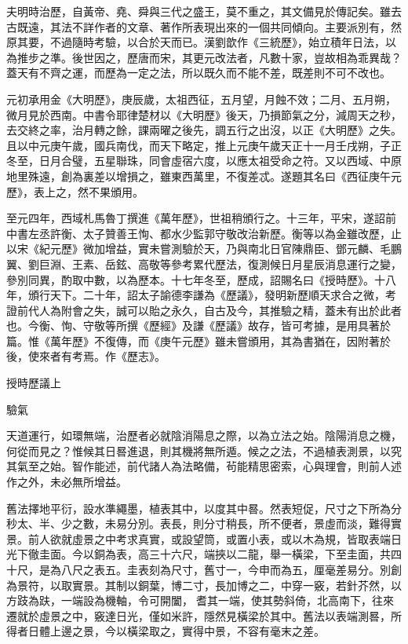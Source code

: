 
\begin{pinyinscope}

 夫明時治歷，自黃帝、堯、舜與三代之盛王，莫不重之，其文備見於傳記矣。雖去古既遠，其法不詳作者的文章、著作所表現出來的一個共同傾向。主要派別有，然原其要，不過隨時考驗，以合於天而已。漢劉歆作《三統歷》，始立積年日法，以為推步之準。後世因之，歷唐而宋，其更元改法者，凡數十家，豈故相為乖異哉？蓋天有不齊之運，而歷為一定之法，所以既久而不能不差，既差則不可不改也。



 元初承用金《大明歷》，庚辰歲，太祖西征，五月望，月蝕不效；二月、五月朔，微月見於西南。中書令耶律楚材以《大明歷》後天，乃損節氣之分，減周天之秒，去交終之率，治月轉之餘，課兩曜之後先，調五行之出沒，以正《大明歷》之失。且以中元庚午歲，國兵南伐，而天下略定，推上元庚午歲天正十一月壬戌朔，子正冬至，日月合璧，五星聯珠，同會虛宿六度，以應太祖受命之符。又以西域、中原地里殊遠，創為裏差以增損之，雖東西萬里，不復差忒。遂題其名曰《西征庚午元歷》，表上之，然不果頒用。



 至元四年，西域札馬魯丁撰進《萬年歷》，世祖稍頒行之。十三年，平宋，遂詔前中書左丞許衡、太子贊善王恂、都水少監郭守敬改治新歷。衡等以為金雖改歷，止以宋《紀元歷》微加增益，實未嘗測驗於天，乃與南北日官陳鼎臣、鄧元麟、毛鵬翼、劉巨淵、王素、岳鉉、高敬等參考累代歷法，復測候日月星辰消息運行之變，參別同異，酌取中數，以為歷本。十七年冬至，歷成，詔賜名曰《授時歷》。十八年，頒行天下。二十年，詔太子諭德李謙為《歷議》，發明新歷順天求合之微，考證前代人為附會之失，誠可以貽之永久，自古及今，其推驗之精，蓋未有出於此者也。今衡、恂、守敬等所撰《歷經》及謙《歷議》故存，皆可考據，是用具著於篇。惟《萬年歷》不復傳，而《庚午元歷》雖未嘗頒用，其為書猶在，因附著於後，使來者有考焉。作《歷志》。



 授時歷議上



 驗氣



 天道運行，如環無端，治歷者必就陰消陽息之際，以為立法之始。陰陽消息之機，何從而見之？惟候其日晷進退，則其機將無所遁。候之之法，不過植表測景，以究其氣至之始。智作能述，前代諸人為法略備，茍能精思密索，心與理會，則前人述作之外，未必無所增益。



 舊法擇地平衍，設水準繩墨，植表其中，以度其中晷。然表短促，尺寸之下所為分秒太、半、少之數，未易分別。表長，則分寸稍長，所不便者，景虛而淡，難得實景。前人欲就虛景之中考求真實，或設望筒，或置小表，或以木為規，皆取表端日光下徹圭面。今以銅為表，高三十六尺，端挾以二龍，舉一橫梁，下至圭面，共四十尺，是為八尺之表五。圭表刻為尺寸，舊寸一，今申而為五，厘毫差易分。別創為景符，以取實景。其制以銅葉，博二寸，長加博之二，中穿一竅，若針芥然，以方跂為趺，一端設為機軸，令可開闔，耆其一端，使其勢斜倚，北高南下，往來遷就於虛景之中，竅達日光，僅如米許，隱然見橫梁於其中。舊法以表端測晷，所得者日體上邊之景，今以橫梁取之，實得中景，不容有毫末之差。




\end{pinyinscope}
